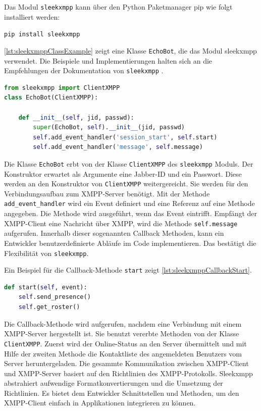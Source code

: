 \documentclass[a4paper,titlepage,halfparskip,12pt]{scrreprt}
\begin{document}
\begin{onehalfspacing}
Das Modul \texttt{sleekxmpp} kann über den Python Paketmanager pip wie folgt installiert werden:

\texttt{pip install sleekxmpp}

\autoref{lst:sleekxmppClassExample} zeigt eine Klasse \texttt{EchoBot}, die das Modul sleekxmpp verwendet. Die Beispiele und Implementierungen halten sich an die Empfehlungen der Dokumentation von \texttt{sleekxmpp} \cite{pythonSleekxmpp}.

\begin{lstlisting}[language=python, caption={Vorbereitungen für die Verwendung des Moduls sleekxmpp}, label={lst:sleekxmppClassExample}]
from sleekxmpp import ClientXMPP
class EchoBot(ClientXMPP):

    def __init__(self, jid, passwd):
        super(EchoBot, self).__init__(jid, passwd)
        self.add_event_handler('session_start', self.start)
        self.add_event_handler('message', self.message)
\end{lstlisting}

Die Klasse \texttt{EchoBot} erbt von der Klasse \texttt{ClientXMPP} des \texttt{sleekxmpp} Moduls. Der Konstruktor erwartet als Argumente eine Jabber-ID und ein Passwort. Diese werden an den Konstruktor von \texttt{ClientXMPP} weitergereicht. Sie werden für den Verbindungsaufbau zum \acs{XMPP}-Server benötigt. Mit der Methode \texttt{add\_event\_handler} wird ein Event definiert und eine Referenz auf eine Methode angegeben. Die Methode wird ausgeführt, wenn das Event eintrifft. Empfängt der \acs{XMPP}-Client eine Nachricht über \acs{XMPP}, wird die Methode \texttt{self.message} aufgerufen. Innerhalb dieser sogenannten Callback Methoden, kann ein Entwickler benutzerdefinierte Abläufe im Code implementieren. Das bestätigt die Flexibilität von \texttt{sleekxmpp}.

Ein Beispiel für die Callback-Methode \texttt{start} zeigt \autoref{lst:sleekxmppCallbackStart}.

\begin{lstlisting}[language=python, caption={Beispiel: Callback-Methode des Moduls sleekxmpp}, label={lst:sleekxmppCallbackStart}]
def start(self, event):
    self.send_presence()
    self.get_roster()
\end{lstlisting}

Die Callback-Methode wird aufgerufen, nachdem eine Verbindung mit einem \acs{XMPP}-Server hergestellt ist. Sie benutzt vererbte Methoden von der Klasse \texttt{ClientXMPP}. Zuerst wird der Online-Status an den Server übermittelt und mit Hilfe der zweiten Methode die Kontaktliste des angemeldeten Benutzers vom Server heruntergeladen. Die gesammte Kommunikation zwischen \acs{XMPP}-Client und \acs{XMPP}-Server basiert auf den Richtlinien des \acs{XMPP}-Protokolls. Sleekxmpp abstrahiert aufwendige Formatkonvertierungen und die Umsetzung der Richtlinien. Es bietet dem Entwickler Schnittstellen und Methoden, um den \acs{XMPP}-Client einfach in Applikationen integrieren zu können.


\end{onehalfspacing}
\end{document}
